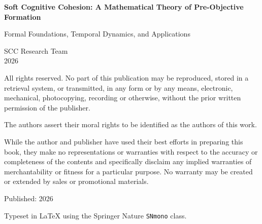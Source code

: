
\thispagestyle{empty}
\vspace*{4cm}

{\centering
\textbf{Soft Cognitive Cohesion: A Mathematical Theory of Pre-Objective Formation}

Formal Foundations, Temporal Dynamics, and Applications

\vspace{2cm}

SCC Research Team\\
2026

\vspace{2cm}

}

\vfill

\noindent
All rights reserved. No part of this publication may be reproduced, stored in a retrieval system, or transmitted, in any form or by any means, electronic, mechanical, photocopying, recording or otherwise, without the prior written permission of the publisher.

The authors assert their moral rights to be identified as the authors of this work.

While the author and publisher have used their best efforts in preparing this book, they make no representations or warranties with respect to the accuracy or completeness of the contents and specifically disclaim any implied warranties of merchantability or fitness for a particular purpose. No warranty may be created or extended by sales or promotional materials.

\vspace{1cm}

{\small
Published: 2026

Typeset in \LaTeX{} using the Springer Nature \texttt{SNmono} class.

}

\cleardoublepage
